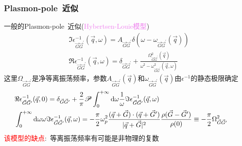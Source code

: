 \documentclass[cjk,slidestop,compress,mathserif,blue]{beamer}
\begin{document}
\frame
{
	\frametitle{\textrm{Plasmon-pole~}近似}
	一般的\textrm{Plasmon-pole~}近似(\textcolor{violet}{\textrm{Hybertsen-Louie}模型})
\begin{displaymath}
	\begin{aligned}
		&\Im\epsilon_{\vec G\vec G^{\prime}}^{-1}(\vec q,\omega)=A_{\vec G\vec G^{\prime}}\delta(\omega-\omega_{\vec G\vec G^{\prime}}(\vec q))\\
		&\Re\epsilon_{\vec G\vec G^{\prime}}^{-1}(\vec q,\omega)=\delta_{\vec G\vec G^{\prime}}+\frac{\Omega_{\vec G\vec G^{\prime}}^2(\vec q)}{\omega^2-\omega_{\vec G\vec G^{\prime}}^2(\vec q,\omega)}
	\end{aligned}
\end{displaymath}
这里$\Omega_{\vec G\vec G^{\prime}}$是净等离振荡频率，参数$A_{\vec G\vec G^{\prime}}(\vec q)$和$\omega_{\vec G\vec G^{\prime}}(\vec q)$由$\epsilon^{-1}$的静态极限确定
\begin{displaymath}
	\hspace*{-15pt}
	\begin{aligned}
		&\Re\epsilon_{\vec G\vec G^{\prime}}^{-1}(\vec q,0)=\delta_{\vec G\vec G^{\prime}}+\frac2{\pi}\mathscr{P}\int_0^{+\infty}\mathrm{d}\omega\frac1{\omega}\Im\epsilon_{\vec G\vec G^{\prime}}^{-1}(\vec q,\omega)\\
		&\int_0^{+\infty}\mathrm{d}\omega\omega\Im\epsilon_{\vec G\vec G^{\prime}}^{-1}(\vec q,\omega)=-\frac{\pi}2\omega_p^2\frac{(\vec q+\vec G)\cdot(\vec q+\vec G^{\prime})}{|\vec q+\vec G|^2}\frac{\rho(\vec G-\vec G^{\prime})}{\rho(0)}\equiv-\frac{\pi}2\Omega_{\vec G\vec G^{\prime}}^2
	\end{aligned}
\end{displaymath}
\textcolor{red}{该模型的缺点}:~等离振荡频率有可能是非物理的复数
}
\end{document}
